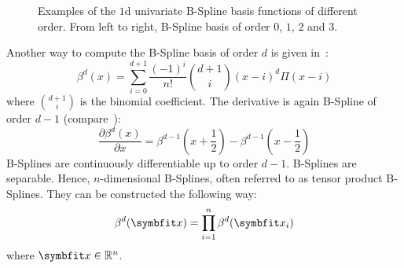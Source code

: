 \begin{figure}
	\centering
	\caption{Examples of the \(1\)d univariate B-Spline basis functions of different order. From
		left to right, B-Spline basis of order \(0\), \(1\), \(2\) and \(3\).
	}\label{fig:bspline_basis_1d}
\end{figure}

Another way to compute the B-Spline basis of order \(d\) is given in~\cite{unser_fast_1991}:
\begin{equation}
	\beta^d(x) = \sum_{i=0}^{d+1} \frac{(-1)^i}{n!} \binom{d+1}{i}(x - i)^d\Pi(x - i)
\end{equation}
where \(\binom{d+1}{i}\) is the binomial coefficient. The derivative is again B-Spline of order
\(d-1\) (compare~\cite{unser_splines_1999}):
\begin{equation}
	\frac{\partial \beta^d(x)}{\partial x} = \beta^{d-1}\left(x + \frac{1}{2}\right) -
	\beta^{d-1}\left(x - \frac{1}{2}\right)
\end{equation}
B-Splines are continuously differentiable up to order \(d-1\). B-Splines are separable. Hence,
\(n\)-dimensional B-Splines, often referred to as tensor product B-Splines. They can be constructed
the following way:
\begin{equation}
	\beta^d(\mvec{x}) = \prod^n_{i=1} \beta^d(\mvec{x}_i)
\end{equation}
where \(\mvec{x} \in \mathbb{R}^n\).

